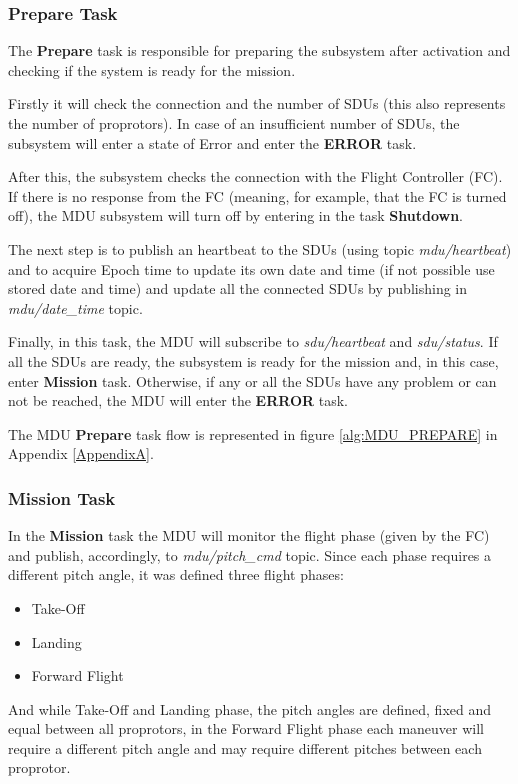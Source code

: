 \subsubsection{Prepare Task}
The \textbf{Prepare} task is responsible for preparing the subsystem after activation and checking if the system is ready for the mission.

Firstly it will check the connection and the number of  SDUs (this also represents the number of proprotors).
In case of an insufficient number of SDUs, the subsystem will enter a state of Error and enter the \textbf{ERROR} task.

After this, the subsystem checks the connection with the Flight Controller (FC).
If there is no response from the FC (meaning, for example, that the FC is turned off), the MDU subsystem will turn off by entering in the task \textbf{Shutdown}.

The next step is to publish an heartbeat to the SDUs (using topic \textit{mdu\slash  heartbeat}) and to acquire Epoch time to update its own date and time (if not possible use stored date and time) and update all the connected SDUs by publishing in \textit{mdu\slash date\_time} topic.

Finally, in this task, the MDU will subscribe to \textit{sdu\slash heartbeat} and \textit{sdu\slash status}.
If all the SDUs are ready, the subsystem is ready for the mission and, in this case, enter \textbf{Mission} task.
Otherwise, if any or all the SDUs have any problem or can not be reached, the MDU will enter the \textbf{ERROR} task.

The MDU \textbf{Prepare} task flow is represented in figure \ref{alg:MDU_PREPARE} in Appendix \ref{AppendixA}.

\subsubsection{Mission Task}
In the \textbf{Mission} task the MDU will monitor the flight phase (given by the FC) and publish, accordingly, to \textit{mdu\slash pitch\_cmd} topic.
Since each phase requires a different pitch angle, it was defined three flight phases:
\begin{itemize}
    \item Take-Off
    \item Landing
    \item Forward Flight
\end{itemize}
And while Take-Off and Landing phase, the pitch angles are defined, fixed and equal between all proprotors, in the Forward Flight phase each maneuver will require a different pitch angle and may require different pitches between each proprotor.

